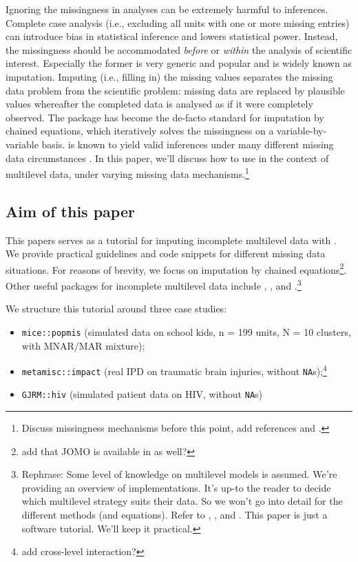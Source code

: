 \documentclass[
]{jss}
\begin{document}
Ignoring the missingness in analyses can be extremely harmful to
inferences. Complete case analysis (i.e., excluding all units with one
or more missing entries) can introduce bias in statistical inference and
lowers statistical power. Instead, the missingness should be
accommodated \emph{before} or \emph{within} the analysis of scientific
interest. Especially the former is very generic and popular and is
widely known as imputation. Imputing (i.e., filling in) the missing
values separates the missing data problem from the scientific problem:
missing data are replaced by plausible values whereafter the completed
data is analysed as if it were completely observed. The 
package  has become the de-facto standard for imputation by
chained equations, which iteratively solves the missingness on a
variable-by-variable basis.  is known to yield valid
inferences under many different missing data circumstances
\citep{buur18}. In this paper, we'll discuss how to use  in
the context of multilevel data, under varying missing data
mechanisms.\footnote{Discuss missingness mechanisms before this point,
  add references \citet{yuce08} and \citet{hox15}.}

\hypertarget{aim-of-this-paper}{%
\subsection{Aim of this paper}\label{aim-of-this-paper}}

This papers serves as a tutorial for imputing incomplete multilevel data
with . We provide practical guidelines and code snippets for
different missing data situations. For reasons of brevity, we focus on
imputation by chained equations\footnote{add that JOMO is available in
   as well?}. Other useful packages for incomplete multilevel
data include , , and .\footnote{Rephrase:
  Some level of knowledge on multilevel models is assumed. We're
  providing an overview of implementations. It's up-to the reader to
  decide which multilevel strategy suits their data. So we won't go into
  detail for the different methods (and equations). Refer to
  \citet{meng94}, \citet{audi18}, and \citet{grun18}. This paper is just
  a software tutorial. We'll keep it practical.}

We structure this tutorial around three case studies:

\begin{itemize}
\item
  \texttt{mice::popmis} (simulated data on school kids, n = 199 units, N
  = 10 clusters, with MNAR/MAR mixture);
\item
  \texttt{metamisc::impact} (real IPD on traumatic brain injuries,
  without \texttt{NA}s);\footnote{add cross-level interaction?}
\item
  \texttt{GJRM::hiv} (simulated patient data on HIV, without
  \texttt{NA}s)
\end{itemize}
\end{document}
